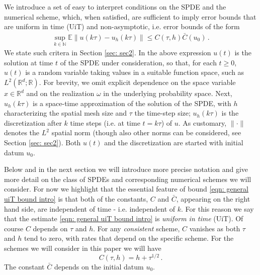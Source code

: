 \documentclass[reqno, 11pt]{amsart}
\theoremstyle{plain}
\theoremstyle{definition}
\theoremstyle{remark}
\numberwithin{equation}{section}
\numberwithin{theorem}{section}
\newcommand{\R}{\mathbb{R}}
\begin{document}
We introduce a set of easy to interpret conditions on the SPDE and the numerical scheme, which, when satisfied, are sufficient to imply error bounds that are uniform in time (UiT) and non-asymptotic, i.e. error bounds of the form
\begin{align}\label{eqn: general uiT bound intro}
\sup_{ k \in \mathbb N } \mathbb E \| u(k\tau) - u_{h}(k\tau)\| \leq  C(\tau, h) \bar C(u_0) \, . 
\end{align}
We state such critera in Section \ref{sec: sec2}. In the above expression $u(t)$ is the solution at time $t$ of the SPDE under consideration, so that, for each $t\geq 0$,  $u(t)$ is a random variable taking values in a suitable function space, such as $L^2(\R^d; \R)$. For brevity, we omit explicit dependence on the space variable $x \in \R^d$ and on the realization $\omega$ in the underlying probability space. Next, $u_{h}(k\tau)$ is a space-time approximation of the solution of the SPDE, with $h$ characterizing the  spatial mesh size  and $\tau$ the time-step size; $u_{h}(k\tau)$ is the discretization after $k$ time steps (i.e. at time $t =k\tau$) of $u$. As customary,   $\| \cdot \|$ denotes the $L^2$ spatial norm (though also other norms can be considered,  see Section \ref{sec: sec2}). Both $u(t)$ and the discretization are started with initial datum $u_0$. 

Below and in the next section we will introduce more precise notation and give more detail on the class of SPDEs and corresponding  numerical schemes we will consider.
For now we highlight that the essential feature of bound \eqref{eqn: general uiT bound intro}  is that both of the constants, $C$ and $\bar C$, appearing on the right hand side, are independent of time  - i.e. independent of $k$.   For this reason we say that the estimate \eqref{eqn: general uiT bound intro} is {\em{uniform in time}} (UiT).  Of course $C$ depends  on $\tau$ and  $h$.  For any {\em consistent} scheme,  $C$ vanishes as both $\tau$ and $h$ tend to zero,  with rates that depend on the specific scheme. For the schemes we will consider in this paper we will have 
$$
C(\tau, h) =  h+\tau^{1/2} \,.
$$
The constant $\bar C$ depends on the initial datum $u_0$.  
\end{document}
